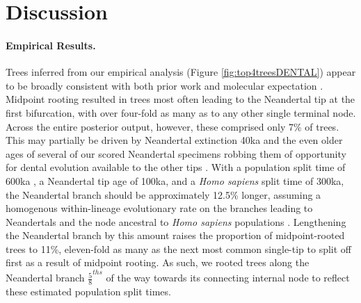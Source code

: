 \clearpage

\section{Discussion}

\paragraph{Empirical Results.} Trees inferred from our empirical analysis (Figure \ref{fig:top4treesDENTAL}) appear to be broadly consistent with both prior work \citep{scottAnthropologyModernHuman2018} and molecular expectation \citep{mallickSimonsGenomeDiversity2016}. Midpoint rooting resulted in trees most often leading to the Neandertal tip at the first bifurcation, with over four-fold as many as to any other single terminal node. Across the entire posterior output, however, these comprised only 7\% of trees. This may partially be driven by Neandertal extinction 40ka \citep{highamTimingSpatiotemporalPatterning2014} and the even older ages of several of our scored Neandertal specimens robbing them of opportunity for dental evolution available to the other tips \citep[e.g. the modal specimen originates from Krapina and dates to around 130ka;][]{rinkESRAgesKrapina1995}. With a population split time of 600ka \citep{nielsenTracingPeoplingWorld2017, schlebuschSouthernAfricanAncient2017}, a Neandertal tip age of 100ka, and a \textit{Homo sapiens} split time of 300ka, the Neandertal branch should be approximately 12.5\% longer, assuming a homogenous within-lineage evolutionary rate on the branches leading to Neandertals and the node ancestral to \textit{Homo sapiens} populations \citep[though not a tree-wide strict clock;][]{gomez-roblesDentalEvolutionaryRates2019}. Lengthening the Neandertal branch by this amount raises the proportion of midpoint-rooted trees to 11\%, eleven-fold as many as the next most common single-tip to split off first as a result of midpoint rooting. As such, we rooted trees along the Neandertal branch $\frac{5}{8}^{ths}$ of the way towards its connecting internal node to reflect these estimated population split times. 

